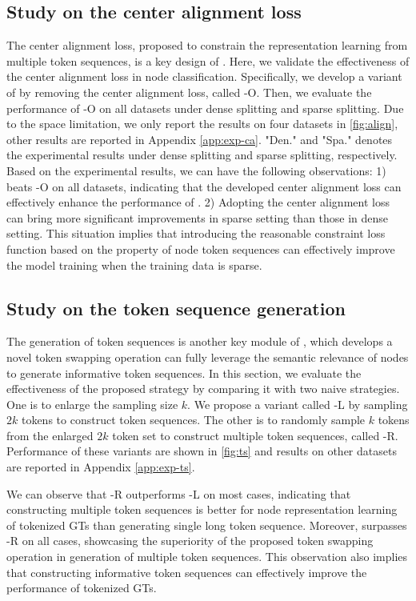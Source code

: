 \subsection{Study on the center alignment loss}
The center alignment loss, proposed to constrain the representation learning from multiple token sequences, is a key design of \name.
Here, we validate the effectiveness of the center alignment loss in node classification.
Specifically, we develop a variant of \name by removing the center alignment loss, called \name-O.
Then, we evaluate the performance of \name-O on all datasets under dense splitting and sparse splitting.
Due to the space limitation, we only report the results on four datasets in \autoref{fig:align}, other results are reported in Appendix \ref{app:exp-ca}.
"Den." and "Spa." denotes the experimental results under dense splitting and sparse splitting, respectively.
Based on the experimental results, we can have the following observations:
1) \name beats \name-O on all datasets, indicating that the developed center alignment loss can effectively enhance the performance of \name.
2) Adopting the center alignment loss can bring more significant improvements in sparse setting than those in dense setting.
This situation implies that introducing the reasonable constraint loss function based on the property of node token sequences can effectively improve the model training when the training data is sparse.






\subsection{Study on the token sequence generation}\label{exp:ts}
The generation of token sequences is another key module of \name, which develops a novel token swapping operation can fully leverage the semantic relevance of nodes to generate informative token sequences.
In this section, we evaluate the effectiveness of the proposed strategy by comparing it with two naive strategies.
One is to enlarge the sampling size $k$. We propose a variant called \name-L by sampling $2k$ tokens to construct token sequences.
The other is to randomly sample $k$ tokens from the enlarged $2k$ token set to construct multiple token sequences, called \name-R.
Performance of these variants are shown in \autoref{fig:ts} and results on other datasets are reported in Appendix \ref{app:exp-ts}.

We can observe that \name-R outperforms \name-L on most cases, indicating that constructing multiple token sequences is better for node representation learning of tokenized GTs than generating single long token sequence. 
Moreover, \name surpasses \name-R on all cases, showcasing the superiority of the proposed token swapping operation in generation of multiple token sequences.
This observation also implies that constructing informative token sequences can effectively improve the performance of tokenized GTs.




